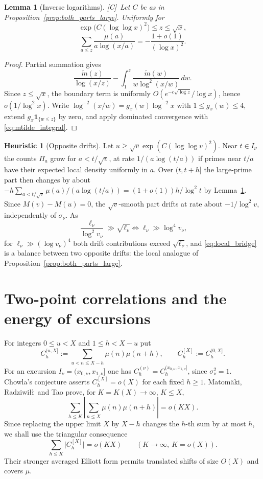 \documentclass[11pt]{amsart}
\numberwithin{equation}{section}
\theoremstyle{plain}
\newtheorem{lemma}[theorem]{Lemma}
\theoremstyle{definition}
\newtheorem{heuristic}[theorem]{Heuristic}
\theoremstyle{remark}
\newcommand{\mt}{\widetilde{m}}
\newcommand{\tagC}{\textup{[C]}}
\begin{document}
\begin{lemma}[Inverse logarithms]
\label{lem:inverse_log_sum}
\tagC\ Let $C$ be as in Proposition~\ref{prop:both_parts_large}. Uniformly for
\[
\exp\bigl(C(\log\log x)^2\bigr)\le z\le\sqrt x,
\]
\begin{equation}
\label{eq:inverse_log_sum}
  \sum_{a\le z}\frac{\mu(a)}{a\log(x/a)}=-\frac{1+o(1)}{(\log x)^2}.
\end{equation}
\end{lemma}

\begin{proof}
Partial summation gives
\[
\frac{\mt(z)}{\log(x/z)}-
\int_1^z\frac{\mt(w)}{w\log^2(x/w)}\,dw.
\]
Since $z\le\sqrt x$, the boundary term is uniformly
$O(e^{-c\sqrt{\log z}}/\log x)$, hence $o(1/\log^2x)$. Write
$\log^{-2}(x/w)=g_x(w)\log^{-2}x$ with $1\le g_x(w)\le4$, extend
$g_x\mathbf1_{\{w\le z\}}$ by zero, and apply dominated convergence with
\eqref{eq:mtilde_integral}.
\end{proof}

\begin{heuristic}[Opposite drifts]
\label{heu:local_drift}
Let $u\ge\sqrt v\exp(C(\log\log v)^2)$. Near $t\in I_\nu$ the counts
$\Pi_a$ grow for $a<t/\sqrt v$, at rate $1/(a\log(t/a))$ if primes near
$t/a$ have their expected local density uniformly in $a$. Over $(t,t+h]$
the large-prime part then changes by about
$-h\sum_{a<t/\sqrt v}\mu(a)/(a\log(t/a))=(1+o(1))h/\log^2t$ by
Lemma~\ref{lem:inverse_log_sum}. Since $M(v)-M(u)=0$, the $\sqrt v$-smooth
part drifts at rate about $-1/\log^2v$, independently of $\sigma_\nu$. As
\[
\frac{\ell_\nu}{\log^2v_\nu}\gg\sqrt{\ell_\nu}
\iff
\ell_\nu\gg\log^4v_\nu,
\]
for $\ell_\nu\gg(\log v_\nu)^4$ both drift contributions exceed
$\sqrt{\ell_\nu}$, and \eqref{eq:local_bridge} is a balance between two
opposite drifts: the local analogue of
Proposition~\ref{prop:both_parts_large}.
\end{heuristic}


\section{Two-point correlations and the energy of excursions}
\label{sec:chowla}

For integers $0\le u<X$ and $1\le h<X-u$ put
\[
C^{(u,X]}_h:=\sum_{u<n\le X-h}\mu(n)\mu(n+h),\qquad
C^{[X]}_h:=C^{(0,X]}_h .
\]
For an excursion $I_\nu=(x_{0,\nu},x_{1,\nu}]$ one has
$C_h^{(\nu)}=C_h^{(x_{0,\nu},x_{1,\nu}]}$, since $\sigma_\nu^2=1$.
Chowla's conjecture asserts $C^{[X]}_h=o(X)$ for each fixed $h\ge1$. Matom\"aki, Radziwi\l\l\ and Tao \cite{MRT15} prove, for
$K=K(X)\to\infty$, $K\le X$,
\[
\sum_{h\le K}\left|\sum_{n\le X}\mu(n)\mu(n+h)\right|=o(KX).
\]
Since replacing the upper limit $X$ by $X-h$ changes the $h$-th sum by at
most $h$, we shall use the triangular consequence
\begin{equation}
\label{eq:MRT}
\sum_{h\le K}\bigl|C^{[X]}_h\bigr|=o(KX)
\qquad(K\to\infty,\ K=o(X)).
\end{equation}
Their stronger averaged Elliott form permits translated shifts of size
$O(X)$ and covers $\mu$.
\end{document}
